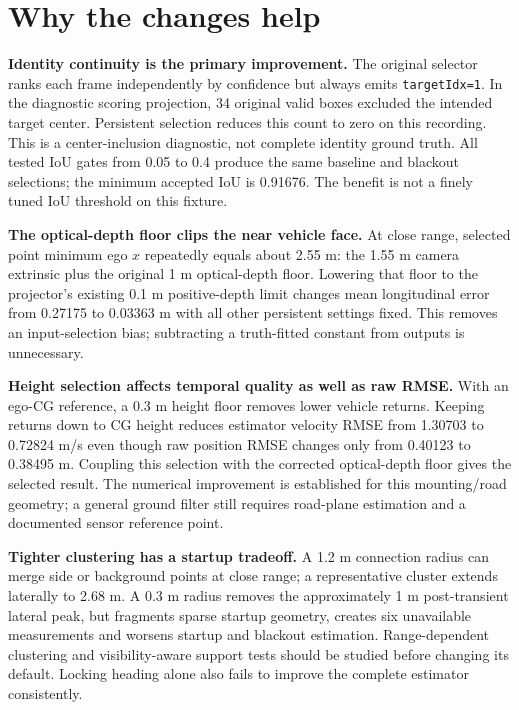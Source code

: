 \documentclass[11pt]{article}
\begin{document}
\section{Why the changes help}
\textbf{Identity continuity is the primary improvement.}
The original selector ranks each frame independently by confidence but always
emits \texttt{targetIdx=1}. In the diagnostic scoring projection, 34 original
valid boxes excluded the intended target center. Persistent selection reduces
this count to zero on this recording. This is a center-inclusion diagnostic,
not complete identity ground truth. All tested IoU gates from 0.05 to 0.4
produce the same baseline and blackout selections; the minimum accepted IoU
is 0.91676. The benefit is not a finely tuned IoU threshold on this fixture.

\textbf{The optical-depth floor clips the near vehicle face.}
At close range, selected point minimum ego $x$ repeatedly equals about
2.55 m: the 1.55 m camera extrinsic plus the original 1 m optical-depth
floor. Lowering that floor to the projector's existing 0.1 m positive-depth
limit changes mean longitudinal error from 0.27175 to 0.03363 m with all
other persistent settings fixed. This removes an input-selection bias;
subtracting a truth-fitted constant from outputs is unnecessary.

\textbf{Height selection affects temporal quality as well as raw RMSE.}
With an ego-CG reference, a 0.3 m height floor removes lower vehicle returns.
Keeping returns down to CG height reduces estimator velocity RMSE from
1.30703 to 0.72824 m/s even though raw position RMSE changes only from
0.40123 to 0.38495 m. Coupling this selection with the corrected optical-depth
floor gives the selected result. The numerical improvement is established
for this mounting/road geometry; a general ground filter still requires
road-plane estimation and a documented sensor reference point.

\textbf{Tighter clustering has a startup tradeoff.}
A 1.2 m connection radius can merge side or background points at close range;
a representative cluster extends laterally to 2.68 m. A 0.3 m radius removes
the approximately 1 m post-transient lateral peak, but fragments sparse
startup geometry, creates six unavailable measurements and worsens startup
and blackout estimation. Range-dependent clustering and visibility-aware
support tests should be studied before changing its default. Locking heading
alone also fails to improve the complete estimator consistently.
\end{document}
